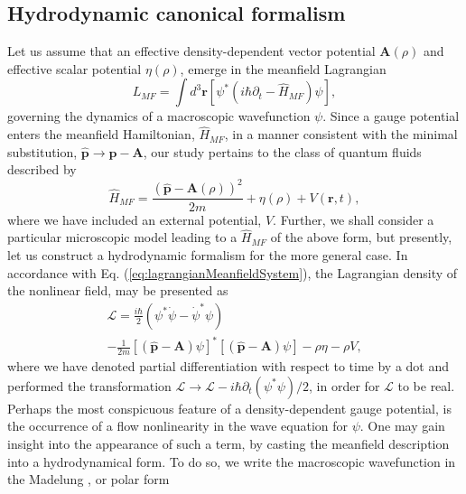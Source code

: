 \documentclass[twocolumn, nofootinbib, nobibnotes, amsmath,amssymb,aps, pra, floatfix]{revtex4-1}
\renewcommand{\v}[1]{\ensuremath{\mathbf{#1}}} %
\begin{document}
\subsection{Hydrodynamic canonical formalism}
Let us assume that an effective density-dependent vector potential $\v{A}\left( \rho \right)$ and effective scalar potential $\eta\left( \rho \right)$, emerge in the meanfield Lagrangian
\begin{equation}
  L_{MF}=\int d^3\v{r}\left[ \psi^{*}\left( i\hbar\partial_t-\hat{H}_{MF} \right)\psi \right],
  \label{eq:lagrangianMeanfieldSystem}
\end{equation}
governing the dynamics of a macroscopic wavefunction $\psi$.
Since a gauge potential enters the meanfield Hamiltonian, $\hat{H}_{MF}$, in a manner consistent with the minimal substitution, $\hat{\v{p}}\rightarrow\hat{\v{p}}-\v{A}$, our study pertains to the class of quantum fluids described by
\begin{equation}
  \hat{H}_{MF}=\frac{\left( \hat{\v{p}}-\v{A}\left( \rho \right) \right)^2}{2m}+\eta\left( \rho \right)+V\left( \v{r},t \right),
  \label{eq:HamiltonianMeanFieldNonlinearEffectivePotentials}
\end{equation}
where we have included an external potential, $V$.
Further, we shall consider a particular microscopic model leading to a $\hat{H}_{MF}$ of the above form, but presently, let us construct a hydrodynamic formalism for the more general case. 
In accordance with Eq. (\ref{eq:lagrangianMeanfieldSystem}), the Lagrangian density of the nonlinear field, may be presented as 
\begin{multline}
  \mathcal{L}=\frac{i\hbar}{2}\left(\psi^*\dot{\psi}-\dot{\psi}^*\psi\right)\\-\frac{1}{2m}\left[ \left( \hat{\v{p}}-\v{A} \right)\psi \right]^*\left[ \left( \hat{\v{p}}-\v{A} \right)\psi \right]-\rho\eta-\rho V,  
  \label{eq:lagrangianDensityMeanFieldEffectivePotentials}
\end{multline}
where we have denoted partial differentiation with respect to time by a dot and performed the transformation $\mathcal{L}\rightarrow\mathcal{L}-i\hbar\partial_t\left( \psi^*\psi \right)/2$, in order for $\mathcal{L}$ to be real.\\
Perhaps the most conspicuous feature of a density-dependent gauge potential, is the occurrence of a flow nonlinearity in the wave equation for $\psi$.
One may gain insight into the appearance of such a term, by casting the meanfield description into a hydrodynamical form. 
To do so, we write the macroscopic wavefunction in the Madelung \cite{madelung1926}, or polar form
\end{document}
